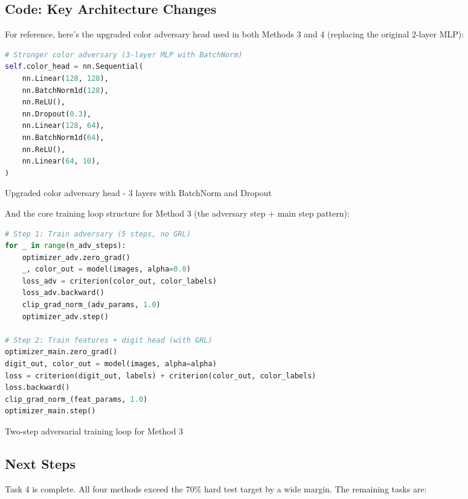 \documentclass[9pt,a4paper,twocolumn,twoside]{tau-class/tau}
\begin{document}
    \subsection{Code: Key Architecture Changes}

        For reference, here's the upgraded color adversary head used in both Methods 3 and 4 (replacing the original 2-layer MLP):

        \begin{code}
            \begin{lstlisting}[language=python]
# Stronger color adversary (3-layer MLP with BatchNorm)
self.color_head = nn.Sequential(
    nn.Linear(128, 128),
    nn.BatchNorm1d(128),
    nn.ReLU(),
    nn.Dropout(0.3),
    nn.Linear(128, 64),
    nn.BatchNorm1d(64),
    nn.ReLU(),
    nn.Linear(64, 10),
)
            \end{lstlisting}
            \caption{Upgraded color adversary head - 3 layers with BatchNorm and Dropout}
            \label{lst:color_head}
        \end{code}

        And the core training loop structure for Method 3 (the adversary step + main step pattern):

        \begin{code}
            \begin{lstlisting}[language=python]
# Step 1: Train adversary (5 steps, no GRL)
for _ in range(n_adv_steps):
    optimizer_adv.zero_grad()
    _, color_out = model(images, alpha=0.0)
    loss_adv = criterion(color_out, color_labels)
    loss_adv.backward()
    clip_grad_norm_(adv_params, 1.0)
    optimizer_adv.step()

# Step 2: Train features + digit head (with GRL)
optimizer_main.zero_grad()
digit_out, color_out = model(images, alpha=alpha)
loss = criterion(digit_out, labels) + criterion(color_out, color_labels)
loss.backward()
clip_grad_norm_(feat_params, 1.0)
optimizer_main.step()
            \end{lstlisting}
            \caption{Two-step adversarial training loop for Method 3}
            \label{lst:m3_training}
        \end{code}

    \subsection{Next Steps}

        Task 4 is complete. All four methods exceed the 70\% hard test target by a wide margin. The remaining tasks are:
\end{document}
